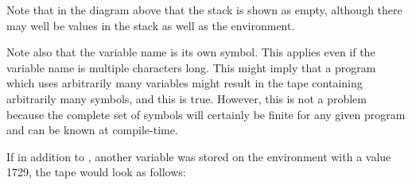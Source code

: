 \begin{center}
\end{center}

Note that in the diagram above that the stack is shown as empty, although there may well be values in the stack as well as the environment.

Note also that the variable name  is its own symbol. This applies even if the variable name is multiple characters long. This might imply that a program which uses arbitrarily many variables might result in the tape containing arbitrarily many symbols, and this is true. However, this is not a problem because the complete set of symbols will certainly be finite for any given program and can be known at compile-time.

If in addition to , another variable  was stored on the environment with a value 1729, the tape would look as follows:

